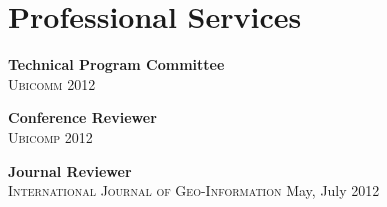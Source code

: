 \section{\sc Professional Services}
{\bf Technical Program Committee}\\
\textsc{Ubicomm} 2012

{\bf Conference Reviewer}\\
\textsc{Ubicomp} 2012

{\bf Journal Reviewer}\\
\textsc{International Journal of Geo-Information} May, July 2012
